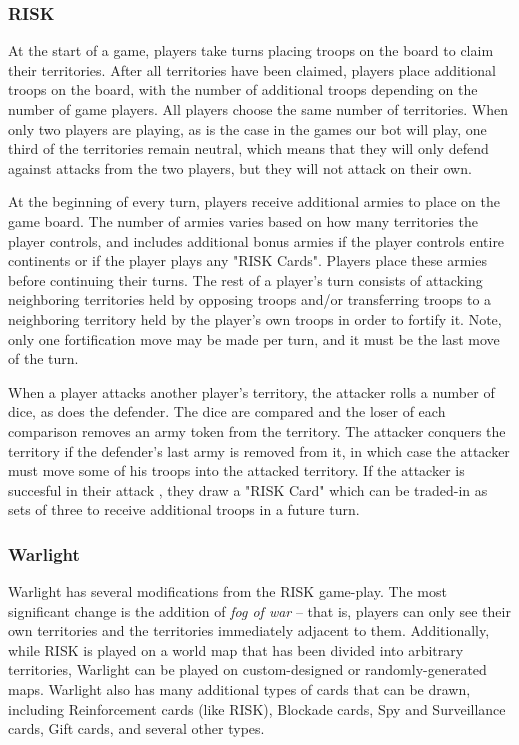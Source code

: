 \documentclass[a4paper,11pt]{article}
\begin{document}
\subsubsection{RISK}
At the start of a game, players take turns placing troops on the board to claim
their territories.  After all territories have been claimed, players place
additional troops on the board, with the number of additional troops depending on
the number of game players.  All players choose the same number of territories.
When only two players are playing, as is the case in the games our bot will play,
one third of the territories remain neutral, which means that they will only defend
against attacks from the two players, but they will not attack on their own.

At the beginning of every turn, players receive additional armies to place on the 
game board.  The number of armies varies based on how many territories the player 
controls, and includes additional bonus armies if the player controls entire 
continents or if the player plays any "RISK Cards".  Players place these armies 
before continuing their turns.  The rest of a player's turn consists of attacking 
neighboring territories held by opposing troops and/or transferring troops to a 
neighboring territory held by the player's own troops in order to fortify it. 
Note, only one fortification move may be made per turn, and it must be the last 
move of the turn.

When a player attacks another player's territory, the attacker rolls a number of 
dice, as does the defender.  The dice are compared and the loser of each comparison 
removes an army token from the territory.  The attacker conquers the territory if 
the defender's last army is removed from it, in which case the attacker must move 
some of his troops into the attacked territory.  If the attacker is succesful in 
their attack , they draw a "RISK Card" which can be traded-in as sets of three 
to receive additional troops in a future turn.

\subsubsection{Warlight}
Warlight has several modifications from the RISK game-play.  The most significant 
change is the addition of \emph{fog of war} -- that is, players can only see 
their own territories and the territories immediately adjacent to them.  
Additionally, while RISK is played on a world map that has been divided into arbitrary 
territories, Warlight can be played on custom-designed or randomly-generated maps.  
Warlight also has many additional types of cards that can be drawn, including 
Reinforcement cards (like RISK), Blockade cards, Spy and Surveillance cards, 
Gift cards, and several other types.
\end{document}
